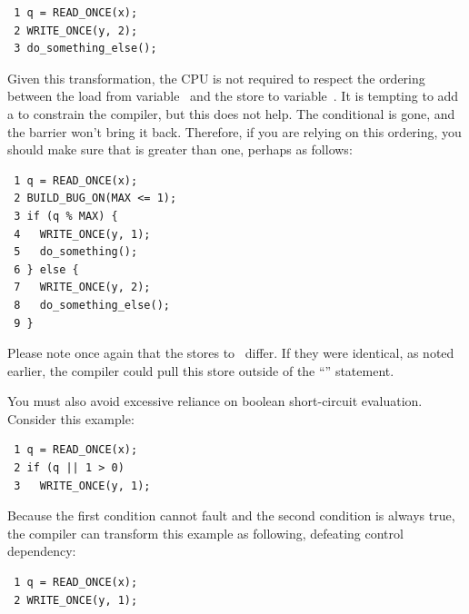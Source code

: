 \vspace{5pt}
\begin{minipage}[t]{\columnwidth}
\scriptsize
\begin{verbatim}
 1 q = READ_ONCE(x);
 2 WRITE_ONCE(y, 2);
 3 do_something_else();
\end{verbatim}
\end{minipage}
\vspace{5pt}

Given this transformation, the CPU is not required to respect the ordering
between the load from variable~ and the store to variable~.
It is tempting to add a  to constrain the compiler,
but this does not help.
The conditional is gone, and the barrier won't bring it back.
Therefore, if you are relying on this ordering, you should make sure
that  is greater than one, perhaps as follows:

\vspace{5pt}
\begin{minipage}[t]{\columnwidth}
\scriptsize
\begin{verbatim}
 1 q = READ_ONCE(x);
 2 BUILD_BUG_ON(MAX <= 1);
 3 if (q % MAX) {
 4   WRITE_ONCE(y, 1);
 5   do_something();
 6 } else {
 7   WRITE_ONCE(y, 2);
 8   do_something_else();
 9 }
\end{verbatim}
\end{minipage}
\vspace{5pt}

Please note once again that the stores to~ differ.
If they were identical, as noted earlier, the compiler could pull this
store outside of the ``'' statement.

You must also avoid excessive reliance on boolean short-circuit evaluation.
Consider this example:

\vspace{5pt}
\begin{minipage}[t]{\columnwidth}
\scriptsize
\begin{verbatim}
 1 q = READ_ONCE(x);
 2 if (q || 1 > 0)
 3   WRITE_ONCE(y, 1);
\end{verbatim}
\end{minipage}
\vspace{5pt}

Because the first condition cannot fault and the second condition is
always true, the compiler can transform this example as following,
defeating control dependency:

\vspace{5pt}
\begin{minipage}[t]{\columnwidth}
\scriptsize
\begin{verbatim}
 1 q = READ_ONCE(x);
 2 WRITE_ONCE(y, 1);
\end{verbatim}
\end{minipage}
\vspace{5pt}

